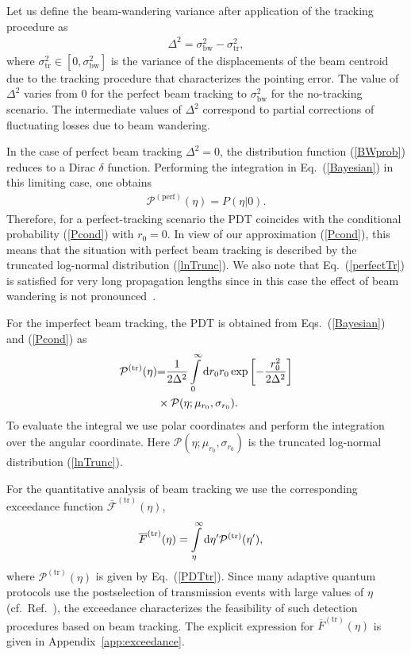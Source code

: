 \documentclass[aps,pra,twocolumn,a4paper,nofootinbib,preprintnumbers] {revtex4-1}
\newcommand{\D}{{\rm{d}}}
\begin{document}
	Let us define the beam-wandering variance after application of the tracking procedure as
	      \begin{align}\label{delta}
	      \Delta^2=\sigma_{\mathrm{bw}}^2-\sigma_{\mathrm{tr}}^2,
	      \end{align}
	where  $\sigma_{\mathrm{tr}}^2\in[0,\sigma^2_{\mathrm{bw}}]$ is the variance of the displacements of the beam centroid  due to the tracking procedure that characterizes the pointing error.
	The value  of $\Delta^2$ varies from $0$ for the perfect beam tracking to $\sigma_{\mathrm{bw}}^2$ for the no-tracking scenario.
	The intermediate values of $\Delta^2$ correspond to  partial corrections of fluctuating losses due to beam wandering.

	In the case of perfect beam tracking $ \Delta^2=0$, the distribution function (\ref{BWprob}) reduces to a Dirac $\delta$ function.
	Performing the integration in  Eq.~(\ref{Bayesian}) in this limiting case, one obtains
		\begin{align}\label{perfectTr}
		\mathcal{P}^{(\mathrm{perf})}(\eta)=P(\eta|0).
		\end{align}
	Therefore,  for a perfect-tracking scenario the PDT coincides with the conditional probability (\ref{Pcond}) with $r_0{=}0$.
	In view of our approximation (\ref{Pcond}), this means that the situation with perfect beam tracking is described by the truncated log-normal distribution (\ref{lnTrunc}).
	We also note that Eq.~(\ref{perfectTr}) is satisfied for  very long propagation lengths since in this case the effect of beam wandering is not pronounced~\cite{Khmelevtsov, Mironov1976}.

	For the imperfect beam tracking, the PDT is obtained from Eqs.~(\ref{Bayesian}) and (\ref{Pcond}) as
		\begin{align}\label{PDTtr}
		\mathcal{P}^{(\mathrm{tr})}(\eta)&{=}\frac{1}{2\Delta^2}\int\limits_0^\infty\D r_0 r_0
		\exp\left[-\frac{r_0^2}{2\Delta^2}\right]\nonumber\\
		&\times \mathcal{P}(\eta;\mu_{r_0},\sigma_{r_0}).
		\end{align}
	To evaluate  the integral we   use polar coordinates and perform the integration over the angular coordinate.
	Here $\mathcal{P}(\eta;\mu_{r_0},\sigma_{r_0})$ is the truncated log-normal distribution (\ref{lnTrunc}).
	

	For the quantitative  analysis of  beam tracking  we use the corresponding exceedance function $\overline{\mathcal{F}}^{(\mathrm{tr})}(\eta)$,
		\begin{align}\label{ExceedanceTr}
		\overline{F}^{(\mathrm{tr})}(\eta)&=\int\limits_\eta^\infty\D\eta^\prime  \mathcal{P}^{(\mathrm{tr})}(\eta^\prime),
		\end{align}
	where $\mathcal{P}^{(\mathrm{tr})}(\eta)$ is given by Eq.~(\ref{PDTtr}).
	Since   many  adaptive quantum protocols use the postselection of transmission events with large values of $\eta$ (cf.~Ref.~\cite{Vasylyev2012}), the exceedance characterizes the feasibility of such detection procedures based on beam tracking.
	The explicit expression for $ \overline{F}^{(\mathrm{tr})}(\eta)$ is given in Appendix~\ref{app:exceedance}.
\end{document}
